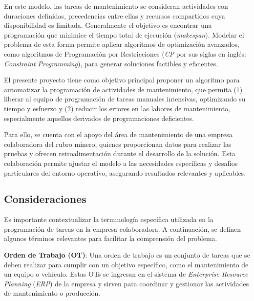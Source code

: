 \documentclass{article}
\begin{document}
En este modelo, las tareas de mantenimiento se consideran actividades con duraciones definidas, precedencias entre ellas y recursos compartidos cuya disponibilidad es limitada. Generalmente el objetivo es encontrar una programación que minimice el tiempo total de ejecución (\textit{makespan}). Modelar el problema de esta forma permite aplicar algoritmos de optimización avanzados, como algoritmos de Programación por Restricciones (\textit{CP} por sus siglas en inglés: \textit{Constraint Programming}), para generar soluciones factibles y eficientes.

El presente proyecto tiene como objetivo principal proponer un algoritmo para automatizar la programación de actividades de mantenimiento, que permita (1) liberar al equipo de programación de tareas manuales intensivas, optimizando su tiempo y esfuerzo y (2) reducir los errores en las labores de mantenimiento, especialmente aquellos derivados de programaciones deficientes. 

Para ello, se cuenta con el apoyo del área de mantenimiento de una empresa colaboradora del rubro minero, quienes proporcionan datos para realizar las pruebas y ofrecen retroalimentación durante el desarrollo de la solución. Esta colaboración permite ajustar el modelo a las necesidades específicas y desafíos particulares del entorno operativo, asegurando resultados relevantes y aplicables.


\subsection{Consideraciones}
Es importante contextualizar la terminología específica utilizada en la programación de tareas en la empresa colaboradora. A continuación, se definen algunos términos relevantes para facilitar la comprensión del problema.


\textbf{Orden de Trabajo (OT)}: Una orden de trabajo es un conjunto de tareas que se deben realizar para cumplir con un objetivo específico, como el mantenimiento de un equipo o vehículo. Estas OTs se ingresan en el sistema de \textit{Enterprise Resource Planning} (\textit{ERP}) de la empresa y sirven para coordinar y gestionar las actividades de mantenimiento o producción.
\end{document}
